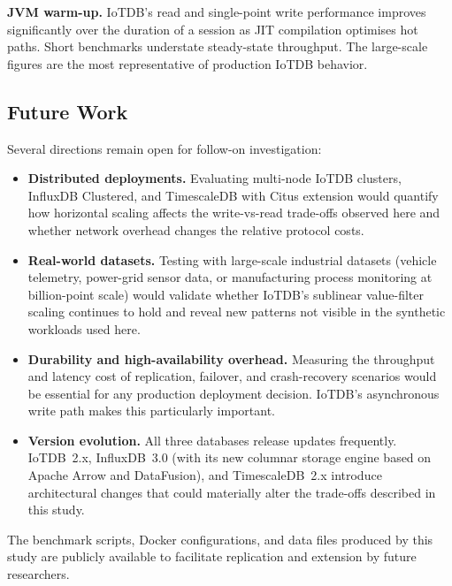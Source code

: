 \textbf{JVM warm-up.} IoTDB's read and single-point write performance improves significantly
over the duration of a session as JIT compilation optimises hot paths. Short benchmarks
understate steady-state throughput. The large-scale figures are the most representative of
production IoTDB behavior.

\subsection{Future Work}
\label{sec:future-work}

Several directions remain open for follow-on investigation:

\begin{itemize}
  \item \textbf{Distributed deployments.} Evaluating multi-node IoTDB clusters, InfluxDB
    Clustered, and TimescaleDB with Citus extension would quantify how horizontal scaling
    affects the write-vs-read trade-offs observed here and whether network overhead changes
    the relative protocol costs.

  \item \textbf{Real-world datasets.} Testing with large-scale industrial datasets
    (vehicle telemetry, power-grid sensor data, or manufacturing process monitoring at
    billion-point scale) would validate whether IoTDB's sublinear value-filter scaling
    continues to hold and reveal new patterns not visible in the synthetic workloads used here.

  \item \textbf{Durability and high-availability overhead.} Measuring the throughput and
    latency cost of replication, failover, and crash-recovery scenarios would be essential
    for any production deployment decision. IoTDB's asynchronous write path makes this
    particularly important.

  \item \textbf{Version evolution.} All three databases release updates frequently. IoTDB~2.x,
    InfluxDB~3.0 (with its new columnar storage engine based on Apache Arrow and DataFusion),
    and TimescaleDB~2.x introduce architectural changes that could materially alter the
    trade-offs described in this study.
\end{itemize}

The benchmark scripts, Docker configurations, and data files produced by this study are
publicly available to facilitate replication and extension by future researchers.
